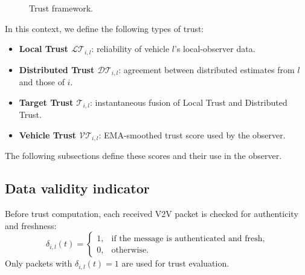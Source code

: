 \documentclass{ifacconf}
\def\LT{\mathcal{LT}} %
\def\DT{\mathcal{DT}} %
\def\VT{\mathcal{VT}} %
\def\T{\mathcal{T}} %
\begin{document}
\begin{figure}[!ht]
    \caption{Trust framework.}
    \label{fig_trust_framework}
\end{figure}

In this context, we define the following types of trust:
\begin{itemize}
    \item \textbf{Local Trust $\LT_{i,l}$}: reliability of vehicle $l$'s local-observer data.
    \item \textbf{Distributed Trust $\DT_{i,l}$}: agreement between distributed estimates from $l$ and those of $i$.
    \item \textbf{Target Trust $\T_{i,l}$}: instantaneous fusion of Local Trust and Distributed Trust.
    \item \textbf{Vehicle Trust $\VT_{i,l}$}: EMA-smoothed trust score used by the observer.
\end{itemize}

The following subsections define these scores and their use in the observer.
\vspace*{-0.3cm}
\subsection{Data validity indicator}
\vspace*{-0.3cm}

Before trust computation, each received V2V packet is checked for authenticity and freshness:
{\small
\begin{equation}
    \delta_{i,l}(t)=
    \begin{cases}
        1, & \text{if the message is authenticated and fresh}, \\
        0, & \text{otherwise.}
    \end{cases}
\end{equation}
}
Only packets with $\delta_{i,l}(t)=1$ are used for trust evaluation.
\end{document}
